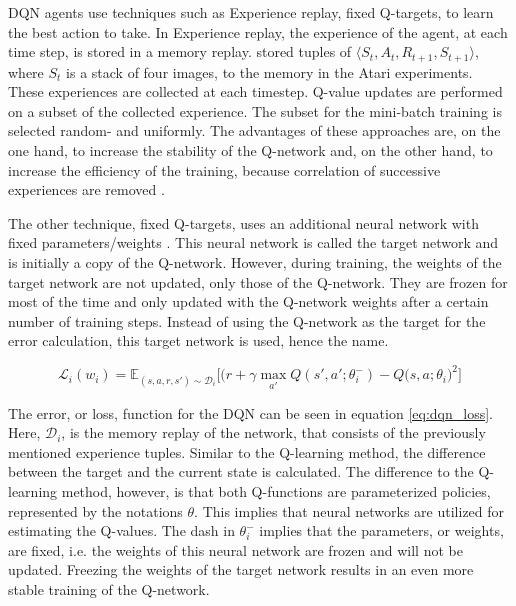 DQN agents use techniques such as Experience replay, fixed Q-targets, to learn the best action to take. In Experience replay, the experience of the agent, at each time step, is stored in a memory replay.  stored tuples of $\langle S_t, A_t, R_{t+1}, S_{t+1} \rangle$, where $S_t$ is a stack of four images, to the memory in the Atari experiments. These experiences are collected at each timestep. Q-value updates are performed on a subset of the collected experience. The subset for the mini-batch training is selected random- and uniformly. The advantages of these approaches are, on the one hand, to increase the stability of the Q-network and, on the other hand, to increase the efficiency of the training, because correlation of successive experiences are removed \cite{richardsutton2018}.

The other technique, fixed Q-targets, uses an additional neural network with fixed parameters/weights \cite{silver2020DQN}. This neural network is called the target network and is initially a copy of the Q-network. However, during training, the weights of the target network are not updated, only those of the Q-network. They are frozen for most of the time and only updated with the Q-network weights after a certain number of training steps. Instead of using the Q-network as the target for the error calculation, this target network is used, hence the name.

\begin{equation}
\mathcal{L}_{i} (w_{i}) = \mathbb{E}_{(s,a,r,s')\sim \mathcal{D}_i} \Bigg[\bigg(    r+\gamma \max_{a'} Q(s',a';\theta_{i}^{-})-Q(s,a;\theta_{i} \bigg)^2\Bigg]
\label{eq:dqn_loss}
\end{equation}

The error, or loss, function for the DQN can be seen in equation \ref{eq:dqn_loss}. Here, $\mathcal{D}_i$, is the memory replay of the network, that consists of the previously mentioned experience tuples. Similar to the Q-learning method, the difference between the target and the current state is calculated. The difference to the Q-learning method, however, is that both Q-functions are parameterized policies, represented by the notations $\theta$. This implies that neural networks are utilized for estimating the Q-values. The dash in $\theta_{i}^{-}$ implies that the parameters, or weights, are fixed, i.e. the weights of this neural network are frozen and will not be updated. Freezing the weights of the target network results in an even more stable training of the Q-network.



